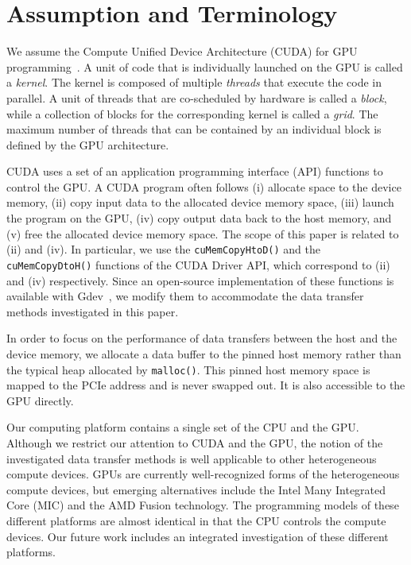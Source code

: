 \section{Assumption and Terminology}
\label{sec:assumption}

We assume the Compute Unified Device Architecture (CUDA) for GPU
programming~\cite{NVIDIA_CUDA}.
A unit of code that is individually launched on the GPU is called
a \textit{kernel}.
The kernel is composed of multiple \textit{threads} that execute the
code in parallel.
A unit of threads that are co-scheduled by hardware is called a
\textit{block}, while a collection of blocks for the corresponding
kernel is called a \textit{grid}.  
The maximum number of threads that can be contained by an individual
block is defined by the GPU architecture.

CUDA uses a set of an application programming interface (API) functions
to control the GPU.
A CUDA program often follows (i) allocate space
to the device memory, (ii) copy input data to the allocated device memory
space, (iii) launch the program on the GPU, (iv) copy output data back
to the host memory, and (v) free the allocated device memory space. 
The scope of this paper is related to (ii) and (iv).
In particular, we use the \texttt{cuMemCopyHtoD()} and the
\texttt{cuMemCopyDtoH()} functions of the CUDA Driver API, which
correspond to (ii) and (iv) respectively.
Since an open-source implementation of these functions is available with
Gdev~\cite{Kato_ATC12}, we modify them to accommodate the data transfer
methods investigated in this paper.

In order to focus on the performance of data transfers between the host
and the device memory, we allocate a data buffer to the pinned host
memory rather than the typical heap allocated by \texttt{malloc()}.
This pinned host memory space is mapped to the PCIe address and is never
swapped out.
It is also accessible to the GPU directly.

Our computing platform contains a single set of the CPU and the GPU.
Although we restrict our attention to CUDA and the GPU, the notion of
the investigated data transfer methods is well applicable to other
heterogeneous compute devices.
GPUs are currently well-recognized forms of the heterogeneous compute
devices, but emerging alternatives include the Intel Many Integrated
Core (MIC) and the AMD Fusion technology.
The programming models of these different platforms are almost identical
in that the CPU controls the compute devices.
Our future work includes an integrated investigation of these different
platforms.

